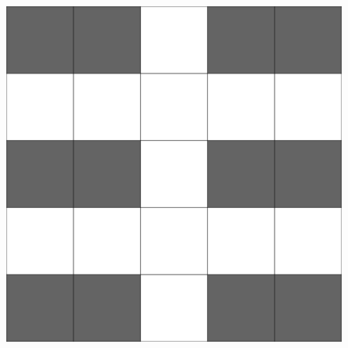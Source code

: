 \documentclass[12pt]{ctexart}
\begin{document}
\begin{figure}[htbp]
\begin{minipage}[t]{0.32\textwidth}
		\includegraphics[width=\textwidth]{pictures/2-3.png}
		\caption{}
	\end{minipage}
\end{figure}
\end{document}
